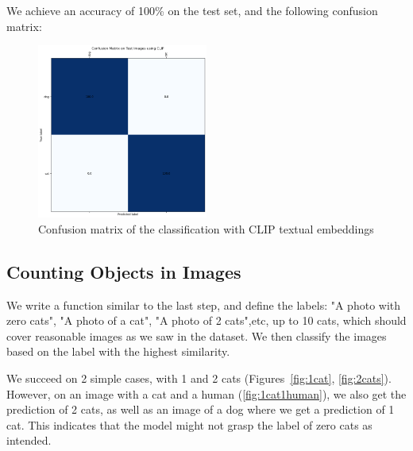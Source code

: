 \documentclass{article}
\begin{document}
We achieve an accuracy of 100\% on the test set, and the following confusion matrix:

\begin{figure}[h!]
    \centering
    \includegraphics[width=0.5\textwidth]{figs/3.4_cm.png}
    \caption{Confusion matrix of the classification with CLIP textual embeddings}
    \label{fig:clip_cm}
\end{figure}

\subsection{Counting Objects in Images}
We write a function similar to the last step, and define the labels: "A photo with zero cats", "A photo of a cat", "A photo of 2 cats",etc, up to 10 cats, which should cover reasonable images as we saw in the dataset. We then classify the images based on the label with the highest similarity. 

We succeed on 2 simple cases, with 1 and 2 cats (Figures~\ref{fig:1cat}, \ref{fig:2cats}). However, on an image with a cat and a human (\ref{fig:1cat1human}), we also get the prediction of 2 cats, as well as an image of a dog where we get a prediction of 1 cat. This indicates that the model might not grasp the label of zero cats as intended.
\end{document}
